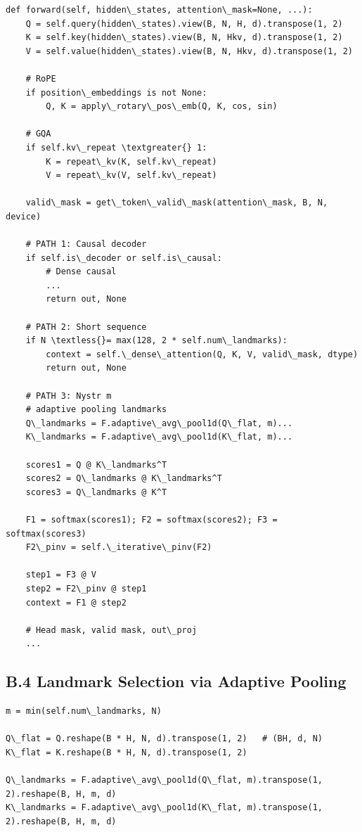 \begin{lstlisting}
def forward(self, hidden\_states, attention\_mask=None, ...):
    Q = self.query(hidden\_states).view(B, N, H, d).transpose(1, 2)
    K = self.key(hidden\_states).view(B, N, Hkv, d).transpose(1, 2)
    V = self.value(hidden\_states).view(B, N, Hkv, d).transpose(1, 2)
    
    # RoPE
    if position\_embeddings is not None:
        Q, K = apply\_rotary\_pos\_emb(Q, K, cos, sin)
    
    # GQA
    if self.kv\_repeat \textgreater{} 1:
        K = repeat\_kv(K, self.kv\_repeat)
        V = repeat\_kv(V, self.kv\_repeat)
    
    valid\_mask = get\_token\_valid\_mask(attention\_mask, B, N, device)
    
    # PATH 1: Causal decoder
    if self.is\_decoder or self.is\_causal:
        # Dense causal
        ...
        return out, None
    
    # PATH 2: Short sequence
    if N \textless{}= max(128, 2 * self.num\_landmarks):
        context = self.\_dense\_attention(Q, K, V, valid\_mask, dtype)
        return out, None
    
    # PATH 3: Nystr m
    # adaptive pooling landmarks
    Q\_landmarks = F.adaptive\_avg\_pool1d(Q\_flat, m)...
    K\_landmarks = F.adaptive\_avg\_pool1d(K\_flat, m)...
    
    scores1 = Q @ K\_landmarks^T
    scores2 = Q\_landmarks @ K\_landmarks^T
    scores3 = Q\_landmarks @ K^T
    
    F1 = softmax(scores1); F2 = softmax(scores2); F3 = softmax(scores3)
    F2\_pinv = self.\_iterative\_pinv(F2)
    
    step1 = F3 @ V
    step2 = F2\_pinv @ step1
    context = F1 @ step2
    
    # Head mask, valid mask, out\_proj
    ...
\end{lstlisting}

\subsection{B.4 Landmark Selection via Adaptive Pooling}

\begin{lstlisting}
m = min(self.num\_landmarks, N)

Q\_flat = Q.reshape(B * H, N, d).transpose(1, 2)   # (BH, d, N)
K\_flat = K.reshape(B * H, N, d).transpose(1, 2)

Q\_landmarks = F.adaptive\_avg\_pool1d(Q\_flat, m).transpose(1, 2).reshape(B, H, m, d)
K\_landmarks = F.adaptive\_avg\_pool1d(K\_flat, m).transpose(1, 2).reshape(B, H, m, d)
\end{lstlisting}

